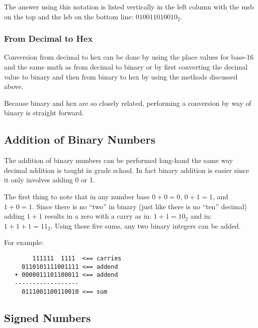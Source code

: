 The answer using this notation is listed vertically
in the left column with the \acrshort{msb} on the top and 
the \acrshort{lsb} on the bottom line: $010011010010_2$.


\subsubsection{From Decimal to Hex}

Conversion from decimal to hex can be done by using the place
values for base-16 and the same math as from decimal to binary
or by first converting the decimal value to binary and then
from binary to hex by using the methods discussed above.

Because binary and hex are so closely related, performing
a conversion by way of binary is straight forward.


\subsection{Addition of Binary Numbers}

The addition of binary numbers can be performed long-hand the
same way decimal addition is taught in grade school.  In fact binary
addition is easier since it only involves adding 0 or 1.

The first thing to note that in any number base $0+0=0$, $0+1=1$, and 
$1+0=1$.  Since there is no ``two'' in binary (just like there is 
no ``ten'' decimal) adding $1+1$ results in a zero with a carry as
in: $1+1=10_2$ and in: $1+1+1=11_2$.  Using these five sums, any two
binary integers can be added.

For example:

\begin{verbatim}
        111111  1111  <== carries
     0110101111001111 <== addend
   + 0000011101100011 <== addend
   ------------------
     0111001100110010 <== sum
\end{verbatim}

\subsection{Signed Numbers}

